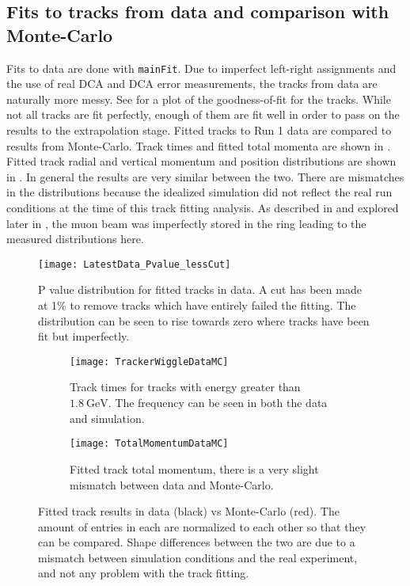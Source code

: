 \subsection{Fits to tracks from data and comparison with Monte-Carlo}


Fits to data are done with \texttt{mainFit}. Due to imperfect left-right assignments and the use of real DCA and DCA error measurements, the tracks from data are naturally more messy. See  for a plot of the goodness-of-fit for the tracks. While not all tracks are fit perfectly, enough of them are fit well in order to pass on the results to the extrapolation stage. Fitted tracks to Run 1 data are compared to results from Monte-Carlo. Track times and fitted total momenta are shown in . Fitted track radial and vertical momentum and position distributions are shown in . In general the results are very similar between the two. There are mismatches in the distributions because the idealized simulation did not reflect the real run conditions at the time of this track fitting analysis. As described in  and explored later in , the muon beam was imperfectly stored in the ring leading to the measured distributions here.


    \begin{figure}[]
        \centering
        \texttt{[image: LatestData\_Pvalue\_lessCut]}
        \caption[P value distribution for fitted tracks in data]{P value distribution for fitted tracks in data. A cut has been made at 1\% to remove tracks which have entirely failed the fitting. The distribution can be seen to rise towards zero where tracks have been fit but imperfectly.}
        \label{fig:pValueData}
    \end{figure}


    \begin{figure}[]
    \centering
        \begin{subfigure}[t]{0.47\textwidth}
            \centering
            \texttt{[image: TrackerWiggleDataMC]}
            \caption{Track times for tracks with energy greater than $\SI{1.8}{\GeV}$. The \gmtwo frequency can be seen in both the data and simulation.}
        \end{subfigure}
        \hspace{5mm}
        \begin{subfigure}[t]{0.47\textwidth}
            \centering
            \texttt{[image: TotalMomentumDataMC]}
            \caption{Fitted track total momentum, there is a very slight mismatch between data and Monte-Carlo.}
        \end{subfigure}
    \caption[Fitted tracks in data compared to Monte-Carlo, track times and total momentum]{Fitted track results in data (black) vs Monte-Carlo (red). The amount of entries in each are normalized to each other so that they can be compared. Shape differences between the two are due to a mismatch between simulation conditions and the real experiment, and not any problem with the track fitting.}
    \label{fig:TracksDataMCFirst}
    \end{figure}


